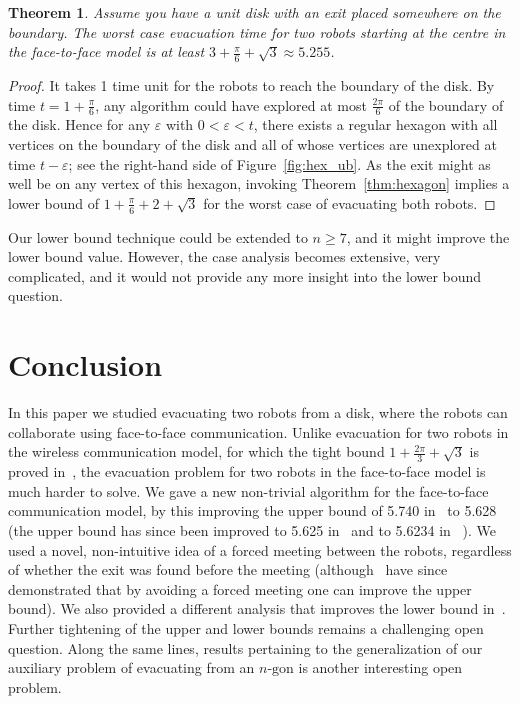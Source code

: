 \documentclass[
final
]{dmtcs-episciences}
\newcommand{\ff}{face-to-face }
\newtheorem{theorem}{Theorem}[section]
\theoremstyle{definition}
\begin{document}
\begin{theorem}
Assume you have a unit disk with an exit placed somewhere on the boundary. 
The worst case evacuation time  for two robots starting at the centre in the \ff model 
  is at least $3+\frac{\pi}{6} + \sqrt{3} \approx 5.255$. \end{theorem}
\begin{proof}
It takes 1 time unit for the robots to reach the boundary of the disk.
By time $t=1+\frac{\pi}{6}$,
any algorithm could have explored at most $\frac{2\pi}{6}$ of the boundary of the disk. 
Hence for any $\varepsilon$ with $0 < \varepsilon < t$, there exists a regular hexagon with all vertices on the boundary of the disk and all of whose vertices are unexplored at time $t-\varepsilon$; see the right-hand side of Figure~\ref{fig:hex_ub}. 
As the exit might as well be on any vertex of this hexagon, invoking Theorem~\ref{thm:hexagon} implies a lower bound of $1+\frac{\pi}{6} + 2 + \sqrt{3}$ for the worst case of evacuating both robots. 
\end{proof}

Our lower bound technique could be extended to $n\geq 7$, and it might 
improve the lower bound value. However, the case analysis becomes 
extensive,
very complicated, and it would not provide any more insight into the 
lower bound question.



\section{Conclusion}
\label{sec:Conclusion}

In this paper we studied evacuating two robots from a disk, where the robots 
can collaborate using \ff communication.
Unlike evacuation for two robots in the wireless communication
model, for which the tight bound $1 + \frac{2\pi}{3}+ \sqrt{3}$
is proved in~\cite{CGGKMP}, the evacuation problem for two robots in
the \ff model is much harder to solve.
We gave a new non-trivial algorithm for the  \ff communication
model, by this improving the upper bound of 5.740
in~\cite{CGGKMP} to 
5.628
(the upper bound has since been improved 
to 5.625 in~\cite{Watten2017}
and to 5.6234 in~\cite{disser2019evacuating}
).
We used a novel, non-intuitive idea of a forced meeting between the robots, 
regardless of whether the exit was found before the meeting (although~\cite{Watten2017,disser2019evacuating} have since demonstrated that by avoiding a forced meeting one can improve the upper bound). 
We also provided a different analysis that improves the lower bound in~\cite{CGGKMP}.
Further tightening of the upper and lower bounds remains a challenging open question. Along the same lines, results pertaining to the generalization of our auxiliary problem of evacuating from an $n\textrm{-gon}$ is another interesting open problem. 
\end{document}
